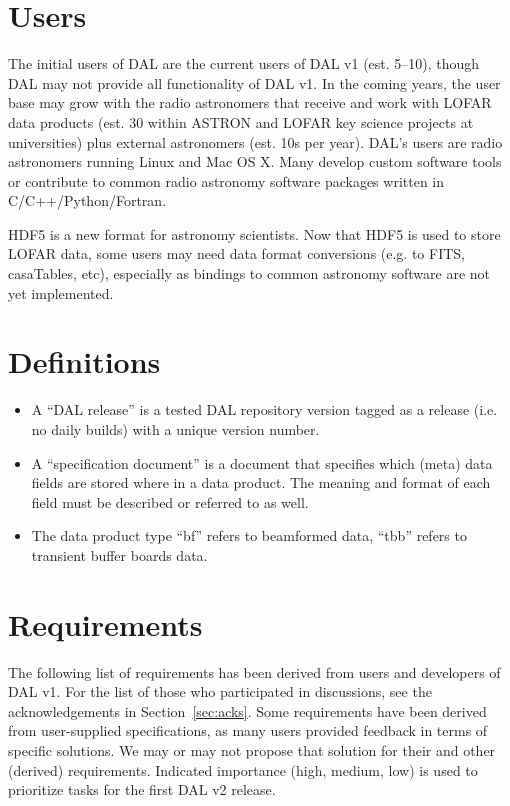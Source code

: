\documentclass[a4paper,11pt]{article}
\begin{document}
\section{Users} \label{sec:users}
The initial users of DAL are the current users of DAL v1 (est. 5--10), though DAL may not provide all functionality of DAL v1.
In the coming years, the user base may grow with the radio astronomers that receive and work with LOFAR data products (est. 30 within ASTRON and LOFAR key science projects at universities) plus external astronomers (est. 10s per year).
DAL's users are radio astronomers running Linux and Mac OS X.
Many develop custom software tools or contribute to common radio astronomy software packages written in C/C++/Python/Fortran.

HDF5 is a new format for astronomy scientists.
Now that HDF5 is used to store LOFAR data, some users may need data format conversions (e.g. to FITS, casaTables, etc), especially as bindings to common astronomy software are not yet implemented.


\section{Definitions} \label{sec:definitions}
\begin{itemize}
\itemsep0em
\item A ``DAL release'' is a tested DAL repository version tagged as a release (i.e. no daily builds) with a unique version number.
\item A ``specification document'' is a document that specifies which (meta) data fields are stored where in a data product.
The meaning and format of each field must be described or referred to as well.
\item The data product type ``bf'' refers to beamformed data, ``tbb'' refers to transient buffer boards data.
\end{itemize}


\section{Requirements} \label{sec:reqs}
The following list of requirements has been derived from users and developers of DAL v1.
For the list of those who participated in discussions, see the acknowledgements in Section~\ref{sec:acks}.
Some requirements have been derived from user-supplied specifications, as many users provided feedback in terms of specific solutions.
We may or may not propose that solution for their and other (derived) requirements.
Indicated importance (high, medium, low) is used to prioritize tasks for the first DAL v2 release.
\end{document}
